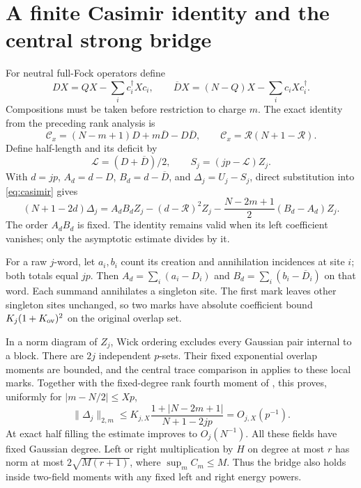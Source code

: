 \documentclass[11pt]{article}
\newcommand{\RR}{\mathcal R}
\newcommand{\LL}{\mathcal L}
\newcommand{\Db}{\overline D}
\begin{document}
\newpage
\section{A finite Casimir identity and the central strong bridge}
For neutral full-Fock operators define
\begin{equation}
 DX=QX-\sum_i c_i^\dagger Xc_i,\qquad
 \Db X=(N-Q)X-\sum_i c_iXc_i^\dagger.
\end{equation}
Compositions must be taken before restriction to charge $m$.
The exact identity from the preceding rank analysis is
\begin{equation}
 \mathcal C_x=(N-m+1)D+m\Db-D\Db,
 \qquad\mathcal C_x=\RR(N+1-\RR).\label{eq:casimir}
\end{equation}
Define half-length and its deficit by
\begin{equation}
 \LL=(D+\Db)/2,
 \qquad S_j=(jp-\LL)Z_j.
\end{equation}
With $d=jp$, $A_d=d-D$, $B_d=d-\Db$, and
$\Delta_j=U_j-S_j$, direct substitution into \eqref{eq:casimir} gives
\begin{equation}
 \boxed{\quad
 (N+1-2d)\Delta_j=A_dB_dZ_j-(d-\RR)^2Z_j
       -\frac{N-2m+1}{2}(B_d-A_d)Z_j.\quad}\label{eq:bridge}
\end{equation}
The order $A_dB_d$ is fixed. The identity remains valid when its left
coefficient vanishes; only the asymptotic estimate divides by it.

For a raw $j$-word, let $a_i,b_i$ count its creation and annihilation
incidences at site $i$; both totals equal $jp$. Then
$A_d=\sum_i(a_i-D_i)$ and $B_d=\sum_i(b_i-\Db_i)$ on that word.
Each summand annihilates a singleton site. The first mark leaves
other singleton sites unchanged, so two marks have absolute
coefficient bound $K_j(1+K_{\rm ov})^2$ on the original overlap set.

In a norm diagram of $Z_j$, Wick ordering excludes every Gaussian
pair internal to a block. There are $2j$ independent $p$-sets.
Their fixed exponential overlap moments are bounded, and the
central trace comparison in \cite{Central} applies to these local marks.
Together with the fixed-degree rank fourth moment of \cite{Series},
this proves, uniformly for $|m-N/2|\le Xp$,
\begin{equation}
 \|\Delta_j\|_{2,m}
 \le K_{j,X}\frac{1+|N-2m+1|}{N+1-2jp}
 =O_{j,X}(p^{-1}).\label{eq:central}
\end{equation}
At exact half filling the estimate improves to $O_j(N^{-1})$.
All these fields have fixed Gaussian degree. Left or right multiplication
by $H$ on degree at most $r$ has norm at most
$2\sqrt{M(r+1)}$, where $\sup_m C_m\le M$.
Thus the bridge also holds inside two-field moments with any fixed
left and right energy powers.
\end{document}
